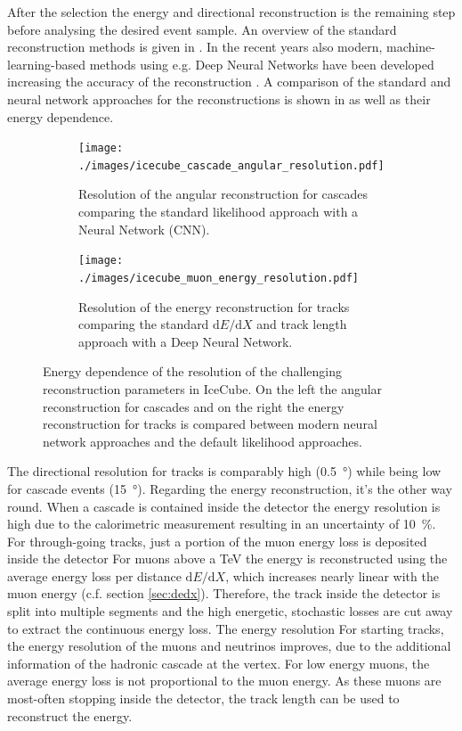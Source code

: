 After the selection the energy and directional reconstruction is the remaining step before analysing the desired event sample.
An overview of the standard reconstruction methods is given in \cite{AMANDA2004Reco, IceCube2014Ereco}.
In the recent years also modern, machine-learning-based methods using e.g. Deep Neural Networks have been developed increasing the accuracy of the reconstruction \cite{Huennefeld17ICRC, Huennefeld17Master, IceCube20DNN}.
A comparison of the standard and neural network approaches for the reconstructions is shown in  as well as their energy dependence.
\begin{figure}
    \centering
    \begin{subfigure}{0.55\textwidth}
        \centering
        \texttt{[image: ./images/icecube\_cascade\_angular\_resolution.pdf]}
        \caption{Resolution of the angular reconstruction for cascades comparing the standard likelihood approach with a Neural Network (CNN). \cite{IceCube20DNN}}
        \label{fig:icecube_angular_resolution}
    \end{subfigure}
    \hfill
    \begin{subfigure}{0.43\textwidth}
        \centering
        \texttt{[image: ./images/icecube\_muon\_energy\_resolution.pdf]}
        \caption{Resolution of the energy reconstruction for tracks comparing the standard $\mathrm{d}E/\mathrm{d}X$ and track length approach with a Deep Neural Network. \cite{Huennefeld17Master}}
        \label{fig:icecube_energy_resolution}
    \end{subfigure}
    \caption{Energy dependence of the resolution of the challenging reconstruction parameters in IceCube. On the left the angular reconstruction for cascades and on the right the energy reconstruction for tracks is compared between modern neural network approaches and the default likelihood approaches.}
    \label{fig:icecube_reco}
\end{figure}

The directional resolution for tracks is comparably high (\SI{0.5}{\degree}) while being low for cascade events (\SI{15}{\degree}).
Regarding the energy reconstruction, it's the other way round.
When a cascade is contained inside the detector the energy resolution is high due to the calorimetric measurement resulting in an uncertainty of \SI{10}{\%}.
For through-going tracks, just a portion of the muon energy loss is deposited inside the detector
For muons above a TeV the energy is reconstructed using the average energy loss per distance $\mathrm{d}E/\mathrm{d}X$, which increases nearly linear with the muon energy (c.f. section \ref{sec:dedx}).
Therefore, the track inside the detector is split into multiple segments and the high energetic, stochastic losses are cut away to extract the continuous energy loss.
The energy resolution 
For starting tracks, the energy resolution of the muons and neutrinos improves, due to the additional information of the hadronic cascade at the vertex.
For low energy muons, the average energy loss is not proportional to the muon energy.
As these muons are most-often stopping inside the detector, the track length can be used to reconstruct the energy.

